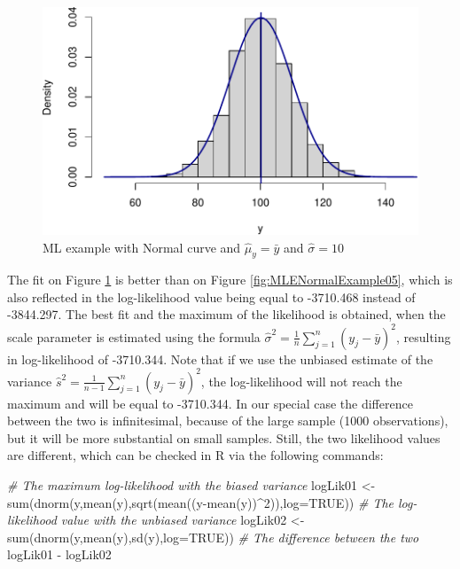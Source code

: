 \documentclass[
]{book}
\newenvironment{Shaded}{\begin{snugshade}}{\end{snugshade}}
\newcommand{\AttributeTok}[1]{\textcolor[rgb]{0.77,0.63,0.00}{#1}}
\newcommand{\CommentTok}[1]{\textcolor[rgb]{0.56,0.35,0.01}{\textit{#1}}}
\newcommand{\ConstantTok}[1]{\textcolor[rgb]{0.00,0.00,0.00}{#1}}
\newcommand{\DecValTok}[1]{\textcolor[rgb]{0.00,0.00,0.81}{#1}}
\newcommand{\FunctionTok}[1]{\textcolor[rgb]{0.00,0.00,0.00}{#1}}
\newcommand{\NormalTok}[1]{#1}
\newcommand{\OtherTok}[1]{\textcolor[rgb]{0.56,0.35,0.01}{#1}}
\newcommand{\SpecialCharTok}[1]{\textcolor[rgb]{0.00,0.00,0.00}{#1}}
\theoremstyle{definition}
\theoremstyle{definition}
\theoremstyle{definition}
\theoremstyle{definition}
\theoremstyle{remark}
\begin{document}
\begin{figure}
\centering
\includegraphics{Svetunkov---Statistics-for-Business-Analytics_files/figure-latex/MLENormalExample06-1.pdf}
\caption{\label{fig:MLENormalExample06}ML example with Normal curve and \(\hat{\mu}_y=\bar{y}\) and \(\hat{\sigma}=10\)}
\end{figure}

The fit on Figure \ref{fig:MLENormalExample06} is better than on Figure \ref{fig:MLENormalExample05}, which is also reflected in the log-likelihood value being equal to -3710.468 instead of -3844.297. The best fit and the maximum of the likelihood is obtained, when the scale parameter is estimated using the formula \(\hat{\sigma}^2 = \frac{1}{n}\sum_{j=1}^n\left(y_j - \bar{y}\right)^2\), resulting in log-likelihood of -3710.344. Note that if we use the unbiased estimate of the variance \(\hat{s}^2 = \frac{1}{n-1}\sum_{j=1}^n\left(y_j - \bar{y}\right)^2\), the log-likelihood will not reach the maximum and will be equal to -3710.344. In our special case the difference between the two is infinitesimal, because of the large sample (1000 observations), but it will be more substantial on small samples. Still, the two likelihood values are different, which can be checked in R via the following commands:

\begin{Shaded}
\begin{Highlighting}[]
\CommentTok{\# The maximum log{-}likelihood with the biased variance}
\NormalTok{logLik01 }\OtherTok{\textless{}{-}} \FunctionTok{sum}\NormalTok{(}\FunctionTok{dnorm}\NormalTok{(y,}\FunctionTok{mean}\NormalTok{(y),}\FunctionTok{sqrt}\NormalTok{(}\FunctionTok{mean}\NormalTok{((y}\SpecialCharTok{{-}}\FunctionTok{mean}\NormalTok{(y))}\SpecialCharTok{\^{}}\DecValTok{2}\NormalTok{)),}\AttributeTok{log=}\ConstantTok{TRUE}\NormalTok{))}
\CommentTok{\# The log{-}likelihood value with the unbiased variance}
\NormalTok{logLik02 }\OtherTok{\textless{}{-}} \FunctionTok{sum}\NormalTok{(}\FunctionTok{dnorm}\NormalTok{(y,}\FunctionTok{mean}\NormalTok{(y),}\FunctionTok{sd}\NormalTok{(y),}\AttributeTok{log=}\ConstantTok{TRUE}\NormalTok{))}
\CommentTok{\# The difference between the two}
\NormalTok{logLik01 }\SpecialCharTok{{-}}\NormalTok{ logLik02}
\end{Highlighting}
\end{Shaded}
\end{document}
